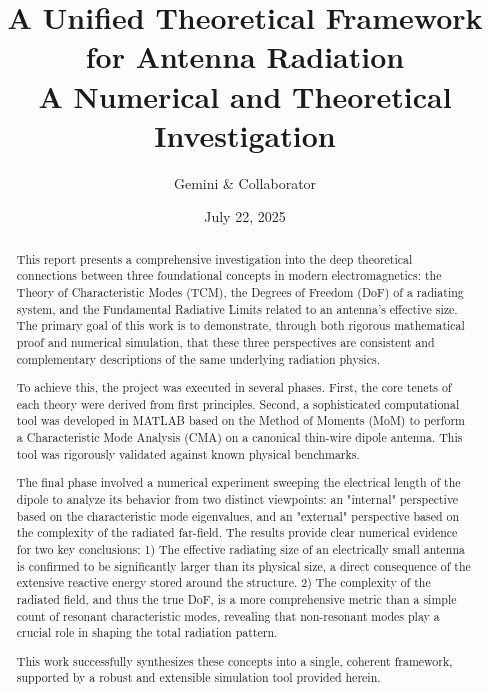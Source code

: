 \documentclass[11pt, a4paper]{report}
\begin{document}
\title{
    \Huge \textbf{A Unified Theoretical Framework for Antenna Radiation} \\
    \large A Numerical and Theoretical Investigation
}
\author{Gemini \& Collaborator}
\date{July 22, 2025}
\maketitle

\begin{abstract}
\noindent This report presents a comprehensive investigation into the deep theoretical connections between three foundational concepts in modern electromagnetics: the Theory of Characteristic Modes (TCM), the Degrees of Freedom (DoF) of a radiating system, and the Fundamental Radiative Limits related to an antenna's effective size. The primary goal of this work is to demonstrate, through both rigorous mathematical proof and numerical simulation, that these three perspectives are consistent and complementary descriptions of the same underlying radiation physics.

To achieve this, the project was executed in several phases. First, the core tenets of each theory were derived from first principles. Second, a sophisticated computational tool was developed in MATLAB based on the Method of Moments (MoM) to perform a Characteristic Mode Analysis (CMA) on a canonical thin-wire dipole antenna. This tool was rigorously validated against known physical benchmarks.

The final phase involved a numerical experiment sweeping the electrical length of the dipole to analyze its behavior from two distinct viewpoints: an "internal" perspective based on the characteristic mode eigenvalues, and an "external" perspective based on the complexity of the radiated far-field. The results provide clear numerical evidence for two key conclusions: 1) The effective radiating size of an electrically small antenna is confirmed to be significantly larger than its physical size, a direct consequence of the extensive reactive energy stored around the structure. 2) The complexity of the radiated field, and thus the true DoF, is a more comprehensive metric than a simple count of resonant characteristic modes, revealing that non-resonant modes play a crucial role in shaping the total radiation pattern.

This work successfully synthesizes these concepts into a single, coherent framework, supported by a robust and extensible simulation tool provided herein.
\end{abstract}
\end{document}

